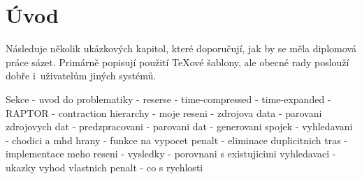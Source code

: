 \chapter*{Úvod}

Následuje několik ukázkových kapitol, které doporučují, jak by se
měla diplomová práce sázet. Primárně popisují použití \TeX{}ové
šablony, ale obecné rady poslouží dobře i~uživatelům jiných
systémů.

Sekce
- uvod do problematiky
- reserse
  - time-compressed
  - time-expanded
  - RAPTOR
  - contraction hierarchy
- moje reseni
  - zdrojova data
  - parovani zdrojovych dat
  - predzpracovani
    - parovani dat
    - generovani spojek
  - vyhledavani
    - chodici a mhd hrany
    - funkce na vypocet penalt
    - eliminace duplicitnich tras
- implementace meho reseni
- vysledky
  - porovnani s existujicimi vyhledavaci
  - ukazky vyhod vlastnich penalt
  - co s rychlosti

